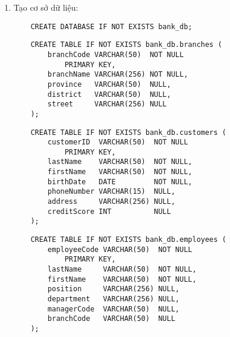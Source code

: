 
\begin{enumerate}[label=\alph*.]

    \item Tạo cơ sở dữ liệu:
    
    \begin{lstlisting}
    CREATE DATABASE IF NOT EXISTS bank_db;
    \end{lstlisting}
    
        
    \begin{lstlisting}
    CREATE TABLE IF NOT EXISTS bank_db.branches (
        branchCode VARCHAR(50)  NOT NULL 
            PRIMARY KEY,
        branchName VARCHAR(256) NOT NULL,
        province   VARCHAR(50)  NULL,
        district   VARCHAR(50)  NULL,
        street     VARCHAR(256) NULL
    );
    \end{lstlisting}

        
    \begin{lstlisting}
    CREATE TABLE IF NOT EXISTS bank_db.customers (
        customerID  VARCHAR(50)  NOT NULL 
            PRIMARY KEY,
        lastName    VARCHAR(50)  NOT NULL,
        firstName   VARCHAR(50)  NOT NULL,
        birthDate   DATE         NOT NULL,
        phoneNumber VARCHAR(15)  NULL,
        address     VARCHAR(256) NULL,
        creditScore INT          NULL
    );
    \end{lstlisting}

    \newpage

        
    \begin{lstlisting}
    CREATE TABLE IF NOT EXISTS bank_db.employees (
        employeeCode VARCHAR(50)  NOT NULL 
            PRIMARY KEY,
        lastName     VARCHAR(50)  NOT NULL,
        firstName    VARCHAR(50)  NOT NULL,
        position     VARCHAR(256) NULL,
        department   VARCHAR(256) NULL,
        managerCode  VARCHAR(50)  NULL,
        branchCode   VARCHAR(50)  NULL
    );
    \end{lstlisting}


\end{enumerate}
